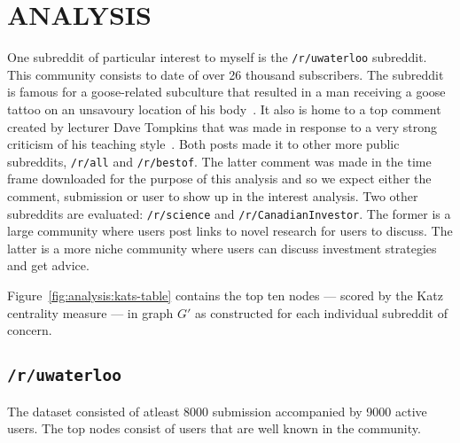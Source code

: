\documentclass[letterpaper, 10 pt, conference]{ieeeconf}
\theoremstyle{definition}
\begin{document}
\section{ANALYSIS}
One subreddit of particular interest to myself is the \texttt{/r/uwaterloo} subreddit. This community consists to date of over 26 thousand subscribers. The subreddit is famous for a goose-related subculture that resulted in a man receiving a goose tattoo on an unsavoury location of his body~\cite{Website:GooseTattoo}. It also is home to a top comment created by lecturer Dave Tompkins that was made in response to a very strong criticism of his teaching style~\cite{Website:dtompkins}. Both posts made it to other more public subreddits, \texttt{/r/all} and \texttt{/r/bestof}. The latter comment was made in the time frame downloaded for the purpose of this analysis and so we expect either the comment, submission or user to show up in the interest analysis. Two other subreddits are evaluated: \texttt{/r/science} and \texttt{/r/CanadianInvestor}. The former is a large community where users post links to novel research for users to discuss. The latter is a more niche community where users can discuss investment strategies and get advice.

Figure~\ref{fig:analysis:kats-table} contains the top ten nodes --- scored by the Katz centrality measure --- in graph \(G'\) as constructed for each individual subreddit of concern. 

\subsection{\texttt{/r/uwaterloo}}
The dataset consisted of atleast 8000 submission accompanied by 9000 active users. The top nodes consist of users that are well known in the community.
\end{document}
